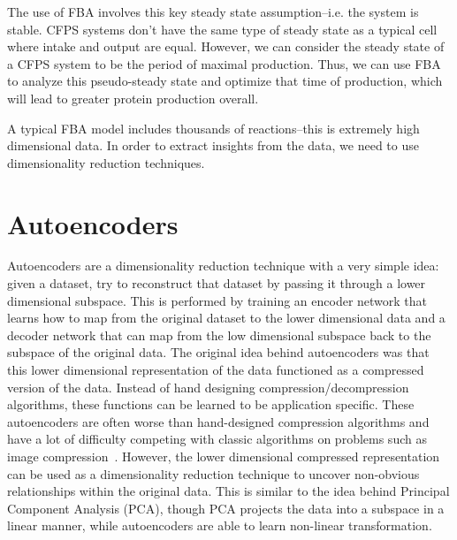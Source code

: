 The use of FBA involves this key steady state assumption--i.e. the system is stable.
CFPS systems don't have the same type of steady state as a typical cell where intake and output are equal.
However, we can consider the steady state of a CFPS system to be the period of maximal production.
Thus, we can use FBA to analyze this pseudo-steady state and optimize that time of production, which will lead to greater protein production overall.

A typical FBA model includes thousands of reactions--this is extremely high dimensional data.
In order to extract insights from the data, we need to use dimensionality reduction techniques.

\section{Autoencoders}
Autoencoders are a dimensionality reduction technique with a very simple idea: given a dataset, try to reconstruct that dataset by passing it through a lower dimensional subspace.
This is performed by training an encoder network that learns how to map from the original dataset to the lower dimensional data and a decoder network that can map from the low dimensional subspace back to the subspace of the original data.
The original idea behind autoencoders was that this lower dimensional representation of the data functioned as a compressed version of the data.
Instead of hand designing compression/decompression algorithms, these functions can be learned to be application specific.
These autoencoders are often worse than hand-designed compression algorithms and have a lot of difficulty competing with classic algorithms on problems such as image compression~\cite{theis2017lossy}.
However, the lower dimensional compressed representation can be used as a dimensionality reduction technique to uncover non-obvious relationships within the original data.
This is similar to the idea behind Principal Component Analysis (PCA), though PCA projects the data into a subspace in a linear manner, while autoencoders are able to learn non-linear transformation.

